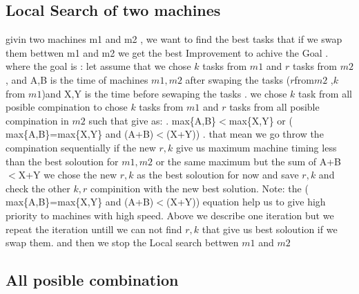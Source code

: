 \documentclass[a4paper,12pt]{report}
\begin{document}
\subsection{Local Search of two machines} 
givin two machines m1 and m2 , we want to find the best tasks that if we swap them bettwen m1 and m2 we get the best Improvement to achive the Goal .\newline
where the goal is :\newline
 let assume that we chose $k$ tasks from $m1$ and $r$ tasks from $m2$ ,  and A,B is the time of machines $m1,m2$ after swaping the tasks ($r $from$ m2$ ,$k$ from $m1$)and X,Y is the time before sewaping the tasks .\newline 
we chose $k$ task from all posible compination to chose $k$ tasks from $m1$ and $r$ tasks  from all posible compination in $m2$ such that give as: .\newline
   max\{A,B\}$<$max\{X,Y\}  or ( max\{A,B\}=max\{X,Y\}  and (A+B)$<$(X+Y)) .\newline
that mean we go throw the compination sequentially if the new  $r,k$ give us maximum machine timing less than the best soloution  for $m1,m2$ or the same maximum but the sum of A+B$<$X+Y we chose the new $r,k$ as the best soloution for now and save $r,k$ and check the other $k,r$   compinition with the new best solution.\newline
Note: the    ( max\{A,B\}=max\{X,Y\}  and (A+B)$<$(X+Y))  equation help us to give high priority to machines with high speed.\newline
Above we describe one iteration but we repeat the iteration untill we can not find $r,k$ that give us best soloution if we swap  them. and then we stop the Local search bettwen $m1$ and $m2$\newline
\subsection{All posible combination } 
\end{document}
